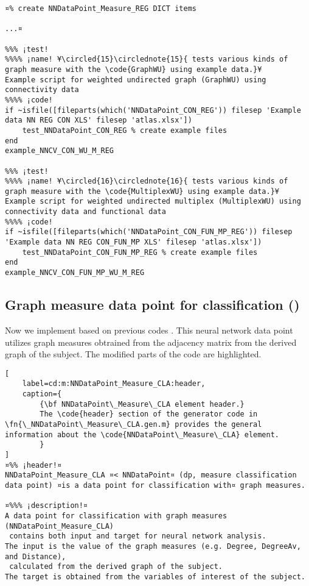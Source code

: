 \documentclass{tufte-handout}
\begin{document}
\begin{lstlisting}
¤% create NNDataPoint_Measure_REG DICT items

...¤

%%% ¡test!
%%%% ¡name! ¥\circled{15}\circlednote{15}{ tests various kinds of graph measure with the \code{GraphWU} using example data.}¥
Example script for weighted undirected graph (GraphWU) using connectivity data
%%%% ¡code!
if ~isfile([fileparts(which('NNDataPoint_CON_REG')) filesep 'Example data NN REG CON XLS' filesep 'atlas.xlsx'])
    test_NNDataPoint_CON_REG % create example files
end
example_NNCV_CON_WU_M_REG

%%% ¡test!
%%%% ¡name! ¥\circled{16}\circlednote{16}{ tests various kinds of graph measure with the \code{MultiplexWU} using example data.}¥
Example script for weighted undirected multiplex (MultiplexWU) using connectivity data and functional data
%%%% ¡code!
if ~isfile([fileparts(which('NNDataPoint_CON_FUN_MP_REG')) filesep 'Example data NN REG CON_FUN_MP XLS' filesep 'atlas.xlsx'])
    test_NNDataPoint_CON_FUN_MP_REG % create example files
end
example_NNCV_CON_FUN_MP_WU_M_REG

\end{lstlisting}

\clearpage

\subsection{Graph measure data point for classification ()}

Now we implement  based on previous codes .
This neural network data point utilizes graph measures obtrained from the adjacency matrix from the derived graph of the subject. 
The modified parts of the code are highlighted.

\begin{lstlisting}[
	label=cd:m:NNDataPoint_Measure_CLA:header,
	caption={
		{\bf NNDataPoint\_Measure\_CLA element header.}
		The \code{header} section of the generator code in \fn{\_NNDataPoint\_Measure\_CLA.gen.m} provides the general information about the \code{NNDataPoint\_Measure\_CLA} element.
		}
]
¤%% ¡header!¤
NNDataPoint_Measure_CLA ¤< NNDataPoint¤ (dp, measure classification data point) ¤is a data point for classification with¤ graph measures.

¤%%% ¡description!¤
A data point for classification with graph measures (NNDataPoint_Measure_CLA) 
 contains both input and target for neural network analysis.
The input is the value of the graph measures (e.g. Degree, DegreeAv, and Distance), 
 calculated from the derived graph of the subject.
The target is obtained from the variables of interest of the subject.
\end{lstlisting}
\end{document}
